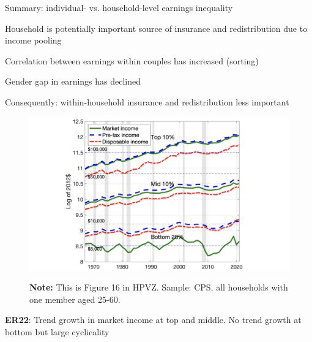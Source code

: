 \documentclass[11pt, aspectratio=169]{beamer}
\newenvironment{witemize}{\itemize\addtolength{\itemsep}{10pt}}{\enditemize}
\begin{document}
\begin{frame}{Summary: individual- vs. household-level earnings inequality}

\begin{witemize}
\item Household is potentially important source of insurance and redistribution due to income pooling

\item Correlation between earnings within couples has increased (sorting)

\item Gender gap in earnings has declined 

\item Consequently: within-household insurance and redistribution less important
\end{witemize}
\end{frame}


\begin{frame}{}
	\begin{figure}
		\includegraphics[scale=0.3]{./figures/inequality_government_1}
	\vspace*{-2mm}
	\begin{flushleft}
		{\scriptsize \hspace{6mm} \textbf{Note:} This is Figure 16 in HPVZ. Sample: CPS, all households with one member aged 25-60.}
	\end{flushleft}	
	\end{figure}

	\vspace{0mm}
	{\color{blue}\textbf{ER22}}: Trend growth in market income at top and middle. No trend growth at bottom but large cyclicality
\end{frame}
\end{document}

